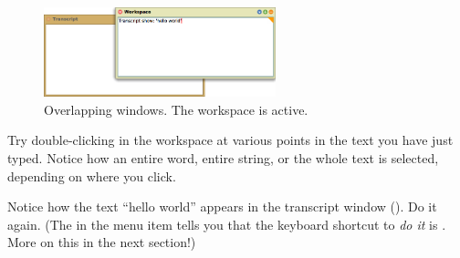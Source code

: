 \documentclass[a4paper,10pt,twoside]{book}
\begin{document}
\begin{figure}[htb]
\centerline {\includegraphics[width=0.6\textwidth]{HelloWorld}}
\caption{Overlapping windows. The workspace is active.\label{fig:helloworld}}
\end{figure}

Try double-clicking in the workspace at various points in the text you have just typed.
Notice how an entire word, entire string, or the whole text is selected, depending on where you click.

Notice how the text ``hello world'' appears in the transcript window
().
Do it again.
(The  in the menu item  tells you that the keyboard shortcut to \emph{do it} is . More on this in the next section!)
\end{document}
